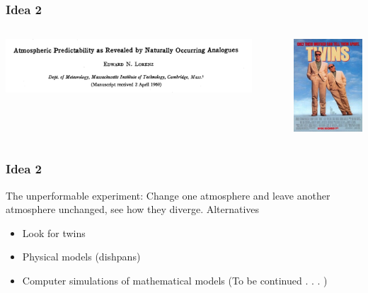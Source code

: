\documentclass[aspectratio=169]{beamer}
\begin{document}
\begin{frame}
\frametitle{Idea 2}

\begin{columns}[c]
\begin{center}
\includegraphics[width = 0.9\textwidth]{figures/lorenz_atmospheric_1969_title}
\end{center}
    \pause
    \begin{center}
\begin{center}
\includegraphics[height = 0.5\textheight]{figures/twins_poster}
\end{center}
    \end{center}
\end{columns}

\end{frame}
\begin{frame}
\frametitle{Idea 2}

The unperformable experiment: Change one atmosphere and leave another atmosphere unchanged, see how they diverge. Alternatives
\begin{itemize}
\item Look for twins
\pause
\item Physical models (dishpans)
\pause
\item Computer simulations of mathematical models \pause (To be continued . . . )
\end{itemize}

\end{frame}
\end{document}
